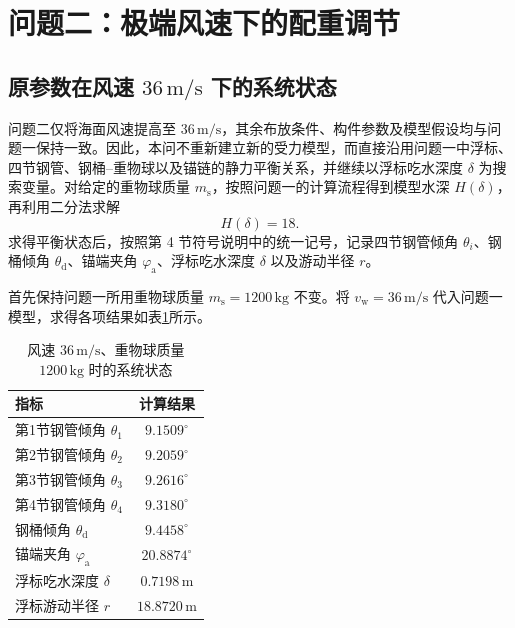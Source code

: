 \section{问题二：极端风速下的配重调节}

\subsection{原参数在风速 $36\,\mathrm{m/s}$ 下的系统状态}

问题二仅将海面风速提高至 $36\,\mathrm{m/s}$，其余布放条件、构件参数及模型假设均与问题一保持一致。因此，本问不重新建立新的受力模型，而直接沿用问题一中浮标、四节钢管、钢桶--重物球以及锚链的静力平衡关系，并继续以浮标吃水深度 $\delta$ 为搜索变量。对给定的重物球质量 $m_{\mathrm s}$，按照问题一的计算流程得到模型水深 $H(\delta)$，再利用二分法求解
\begin{equation}
  H(\delta)=18.
  \label{eq:q2-depth-closure}
\end{equation}
求得平衡状态后，按照第 4 节符号说明中的统一记号，记录四节钢管倾角 $\theta_i$、钢桶倾角 $\theta_{\mathrm d}$、锚端夹角 $\varphi_{\mathrm a}$、浮标吃水深度 $\delta$ 以及游动半径 $r$。

首先保持问题一所用重物球质量 $m_{\mathrm s}=1200\,\mathrm{kg}$ 不变。将 $v_{\mathrm w}=36\,\mathrm{m/s}$ 代入问题一模型，求得各项结果如表\ref{tab:q2-original}所示。

\begin{table}[H]
  \centering
  \caption{风速 $36\,\mathrm{m/s}$、重物球质量 $1200\,\mathrm{kg}$ 时的系统状态}
  \label{tab:q2-original}
  \begin{tabular}{lc}
    \toprule
    指标 & 计算结果 \\
    \midrule
    第1节钢管倾角 $\theta_1$ & $9.1509^{\circ}$ \\
    第2节钢管倾角 $\theta_2$ & $9.2059^{\circ}$ \\
    第3节钢管倾角 $\theta_3$ & $9.2616^{\circ}$ \\
    第4节钢管倾角 $\theta_4$ & $9.3180^{\circ}$ \\
    钢桶倾角 $\theta_{\mathrm d}$ & $9.4458^{\circ}$ \\
    锚端夹角 $\varphi_{\mathrm a}$ & $20.8874^{\circ}$ \\
    浮标吃水深度 $\delta$ & $0.7198\,\mathrm{m}$ \\
    浮标游动半径 $r$ & $18.8720\,\mathrm{m}$ \\
    \bottomrule
  \end{tabular}
\end{table}

